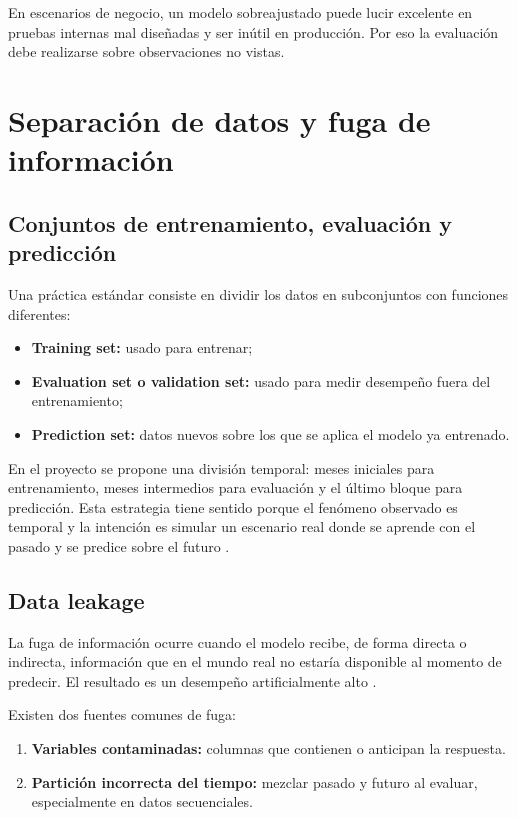 \documentclass[12pt]{article}
\begin{document}
En escenarios de negocio, un modelo sobreajustado puede lucir excelente en pruebas internas mal diseñadas y ser inútil en producción. Por eso la evaluación debe realizarse sobre observaciones no vistas.

\section{Separación de datos y fuga de información}
\subsection{Conjuntos de entrenamiento, evaluación y predicción}
Una práctica estándar consiste en dividir los datos en subconjuntos con funciones diferentes:
\begin{itemize}[leftmargin=*]
\item \textbf{Training set:} usado para entrenar;
\item \textbf{Evaluation set o validation set:} usado para medir desempeño fuera del entrenamiento;
\item \textbf{Prediction set:} datos nuevos sobre los que se aplica el modelo ya entrenado.
\end{itemize}

En el proyecto se propone una división temporal: meses iniciales para entrenamiento, meses intermedios para evaluación y el último bloque para predicción. Esta estrategia tiene sentido porque el fenómeno observado es temporal y la intención es simular un escenario real donde se aprende con el pasado y se predice sobre el futuro \cite{gcp_bqml_eval_overview}.

\subsection{Data leakage}
La fuga de información ocurre cuando el modelo recibe, de forma directa o indirecta, información que en el mundo real no estaría disponible al momento de predecir. El resultado es un desempeño artificialmente alto \cite{gcp_bqml_eval_overview,google_overfitting}.

Existen dos fuentes comunes de fuga:
\begin{enumerate}[label=\textbf{L\arabic*.}, leftmargin=*]
\item \textbf{Variables contaminadas:} columnas que contienen o anticipan la respuesta.
\item \textbf{Partición incorrecta del tiempo:} mezclar pasado y futuro al evaluar, especialmente en datos secuenciales.
\end{enumerate}
\end{document}
